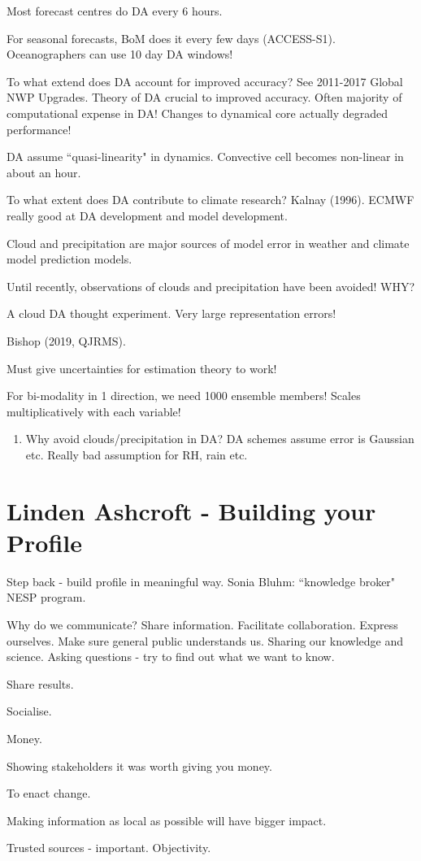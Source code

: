 \documentclass[12pt]{article}
\begin{document}
Most forecast centres do DA every 6 hours.

For seasonal forecasts, BoM does it every few days (ACCESS-S1). Oceanographers can use 10 day DA windows! 

To what extend does DA account for improved accuracy? See 2011-2017 Global NWP Upgrades. Theory of DA crucial to improved accuracy. Often majority of computational expense in DA! Changes to dynamical core actually degraded performance! 

DA assume ``quasi-linearity" in dynamics. Convective cell becomes non-linear in about an hour. 

To what extent does DA contribute to climate research? Kalnay (1996). ECMWF really good at DA development and model development. 

Cloud and precipitation are major sources of model error in weather and climate model prediction models. 

Until recently, observations of clouds and precipitation have been avoided! WHY?

A cloud DA thought experiment. Very large representation errors! 

Bishop (2019, QJRMS). 

Must give uncertainties for estimation theory to work!

For bi-modality in 1 direction, we need 1000 ensemble members! Scales multiplicatively with each variable! 

\begin{enumerate}
\item
Why avoid clouds/precipitation in DA? DA schemes assume error is Gaussian etc. Really bad assumption for RH, rain etc. 
\end{enumerate}

\section{Linden Ashcroft - Building your Profile}
Step back - build profile in meaningful way. Sonia Bluhm: ``knowledge broker" NESP program.

Why do we communicate? Share information. Facilitate collaboration. Express ourselves. Make sure general public understands us. Sharing our knowledge and science. Asking questions - try to find out what we want to know. 

Share results.

Socialise.

Money.

Showing stakeholders it was worth giving you money. 

To enact change. 

Making information as local as possible will have bigger impact. 

Trusted sources - important. Objectivity. 


\end{document}
